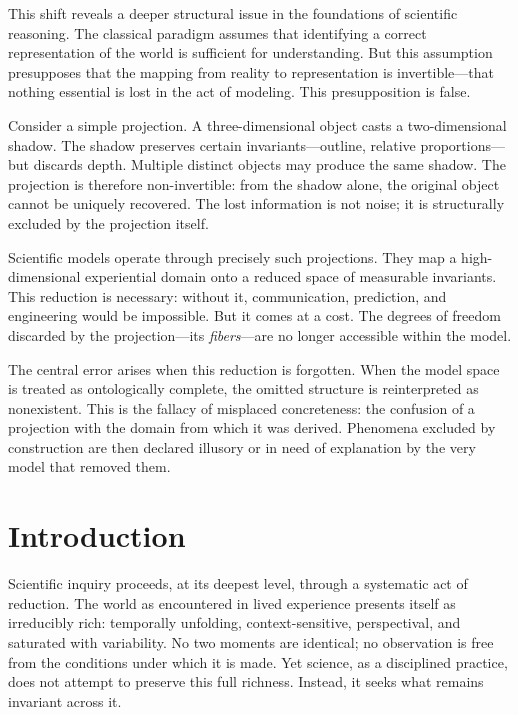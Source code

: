 \documentclass[11pt,openany]{book}
\begin{document}
This shift reveals a deeper structural issue in the foundations of scientific reasoning. The classical paradigm assumes that identifying a correct representation of the world is sufficient for understanding. But this assumption presupposes that the mapping from reality to representation is invertible—that nothing essential is lost in the act of modeling. This presupposition is false.

Consider a simple projection. A three-dimensional object casts a two-dimensional shadow. The shadow preserves certain invariants—outline, relative proportions—but discards depth. Multiple distinct objects may produce the same shadow. The projection is therefore non-invertible: from the shadow alone, the original object cannot be uniquely recovered. The lost information is not noise; it is structurally excluded by the projection itself.

Scientific models operate through precisely such projections. They map a high-dimensional experiential domain onto a reduced space of measurable invariants. This reduction is necessary: without it, communication, prediction, and engineering would be impossible. But it comes at a cost. The degrees of freedom discarded by the projection—its \emph{fibers}—are no longer accessible within the model.

The central error arises when this reduction is forgotten. When the model space is treated as ontologically complete, the omitted structure is reinterpreted as nonexistent. This is the fallacy of misplaced concreteness: the confusion of a projection with the domain from which it was derived. Phenomena excluded by construction are then declared illusory or in need of explanation by the very model that removed them.

\section{Introduction}
\label{sec:introduction-projection}

Scientific inquiry proceeds, at its deepest level, through a systematic act of reduction. The world as encountered in lived experience presents itself as irreducibly rich: temporally unfolding, context-sensitive, perspectival, and saturated with variability. No two moments are identical; no observation is free from the conditions under which it is made. Yet science, as a disciplined practice, does not attempt to preserve this full richness. Instead, it seeks what remains invariant across it.
\end{document}
